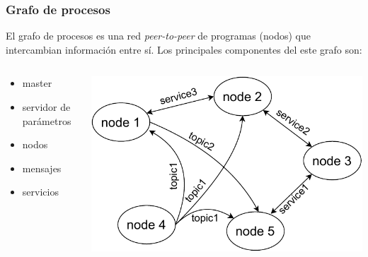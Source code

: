 \begin{frame}\frametitle{Grafo de procesos}
  El grafo de procesos es una red \textit{peer-to-peer} de programas (nodos) que intercambian información entre sí. Los principales componentes del este grafo son:
  \[\]
  \begin{columns}
    \begin{column}{0.5\textwidth}
      \begin{itemize}
      \item master
      \item servidor de parámetros
      \item nodos
      \item mensajes
      \item servicios 
      \end{itemize}
    \end{column}
    \begin{column}{0.5\textwidth}
      \includegraphics[width=\textwidth]{Figures/RosGraph.pdf}
    \end{column}
  \end{columns}
\end{frame}

